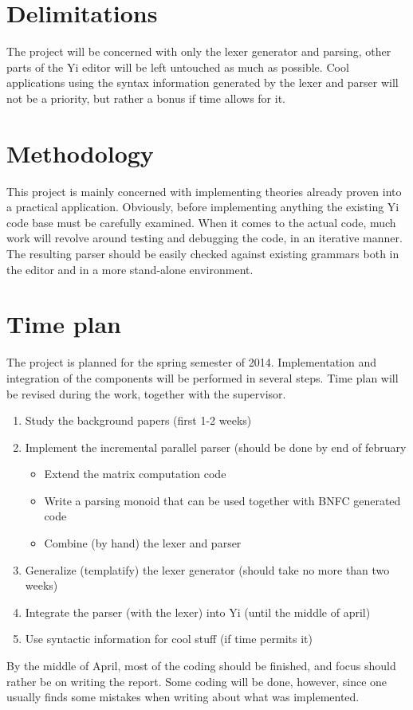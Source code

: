 \documentclass[a4paper,12pt]{article}
\begin{document}
\section*{Delimitations}
The project will be concerned with only the lexer generator and parsing, other
parts of the Yi editor will be left untouched as much as possible. Cool
applications using the syntax information generated by the lexer and parser will
not be a priority, but rather a bonus if time allows for it.

\section*{Methodology}
This project is mainly concerned with implementing theories already proven into
a practical application. Obviously, before implementing anything the existing Yi
code base must be carefully examined. When it comes to the actual code, much
work will revolve around testing and debugging the code, in an iterative manner.
The resulting parser should be easily checked against existing grammars both in
the editor and in a more stand-alone environment. 

\section*{Time plan}
The project is planned for the spring semester of 2014. Implementation and
integration of the components will be performed in several steps. Time plan will
be revised during the work, together with the supervisor.
\begin{enumerate}
    \item{Study the background papers (first 1-2 weeks)}
    \item{Implement the incremental parallel parser (should be done by end of
          february}
        \begin{itemize}
            \item{Extend the matrix computation code}
            \item{Write a parsing monoid that can be used together with BNFC
                  generated code}
            \item{Combine (by hand) the lexer and parser}
        \end{itemize}
    \item{Generalize (templatify) the lexer generator (should take no more than
          two weeks)}
    \item{Integrate the parser (with the lexer) into Yi (until the middle of
          april)}
    \item{Use syntactic information for cool stuff (if time permits it)}
\end{enumerate}
By the middle of April, most of the coding should be finished, and focus should
rather be on writing the report. Some coding will be done, however, since one
usually finds some mistakes when writing about what was implemented.
\end{document}
